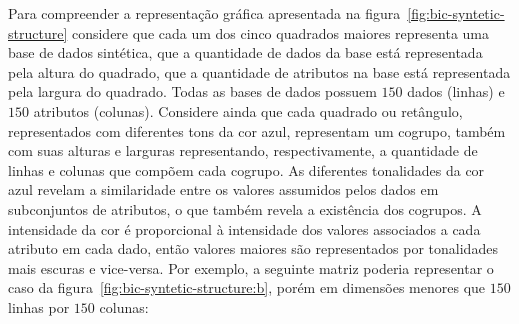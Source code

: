 \documentclass[
    12pt,                %
    oneside,            %
    a4paper,            %
    english,            %
    brazil                %
    ]{abntex2ppgsi}
\begin{document}

Para compreender a representação gráfica apresentada na figura~\ref{fig:bic-syntetic-structure} considere que cada um dos cinco quadrados maiores representa uma base de dados sintética, que a quantidade de dados da base está representada pela altura do quadrado, que a quantidade de atributos na base está representada pela largura do quadrado.
Todas as bases de dados possuem $150$ dados (linhas) e $150$ atributos (colunas).
Considere ainda que cada quadrado ou retângulo, representados com diferentes tons da cor azul, representam um cogrupo, também com suas alturas e larguras representando, respectivamente, a quantidade de linhas e colunas que compõem cada cogrupo.
As diferentes tonalidades da cor azul revelam a similaridade entre os valores assumidos pelos dados em subconjuntos de atributos, o que também revela a existência dos cogrupos.
A intensidade da cor é proporcional à intensidade dos valores associados a cada atributo em cada dado, então valores maiores são representados por tonalidades mais escuras e vice-versa.
Por exemplo, a seguinte matriz poderia representar o caso da figura~\ref{fig:bic-syntetic-structure:b}, porém em dimensões menores que $150$ linhas por $150$ colunas:
\end{document}
